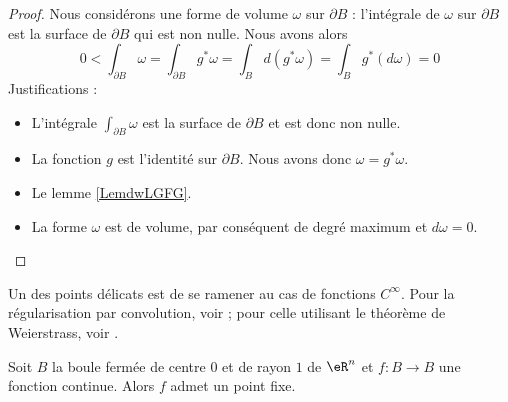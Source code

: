 \begin{proof}
    Nous considérons une forme de volume \( \omega\) sur \( \partial B\) : l'intégrale de \( \omega\) sur \( \partial B\) est la surface de \( \partial B\) qui est non nulle. Nous avons alors
    \begin{equation}
        0<\int_{\partial B}\omega
        =\int_{\partial B}g^*\omega
        =\int_Bd(g^*\omega)
        =\int_Bg^*(d\omega)
        =0
    \end{equation}
    Justifications :
    \begin{itemize}
        \item 
            L'intégrale \( \int_{\partial B}\omega\) est la surface de \( \partial B\) et est donc non nulle.
        \item
            La fonction \( g\) est l'identité sur \( \partial B\). Nous avons donc \( \omega=g^*\omega\).
        \item
            Le lemme \ref{LemdwLGFG}.
        \item
            La forme \( \omega\) est de volume, par conséquent de degré maximum et \( d\omega=0\).
    \end{itemize}
\end{proof}

Un des points délicats est de se ramener au cas de fonctions \( C^{\infty}\). Pour la régularisation par convolution, voir \cite{AllardBrouwer}; pour celle utilisant le théorème de Weierstrass, voir \cite{KuttlerTopInAl}.
\begin{theorem}\label{ThoRGjGdO}
    Soit \( B\) la boule fermée de centre \( 0\) et de rayon \( 1\) de \( \eR^n\) et \( f\colon B\to B\) une fonction continue. Alors \( f\) admet un point fixe.
\end{theorem}

